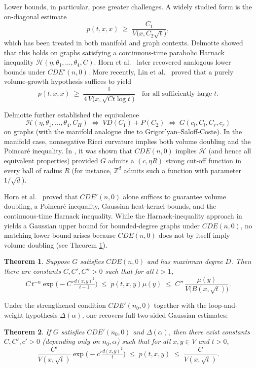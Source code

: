 \documentclass[reqno,12pt]{amsart}
\numberwithin{equation}{section}
\newtheorem{theorem}{Theorem}[section]
\begin{document}
	Lower bounds, in particular, pose greater challenges.  A widely studied form is the on‐diagonal estimate
	\[
	p(t,x,x)\;\ge\;\frac{C_1}{V\bigl(x,C_2\sqrt t\bigr)},
	\]
	which has been treated in both manifold and graph contexts.  Delmotte \cite{delmotte1999parabolic} showed that this holds on graphs satisfying a continuous‐time parabolic Harnack inequality $\mathcal H(\eta,\theta_1,\dots,\theta_4,C)$.  Horn et al.\ \cite{horn2019volume} later recovered analogous lower bounds under $CDE'(n,0)$.  More recently, Lin et al.\ \cite{lin2017diagonal} proved that a purely volume‐growth hypothesis suffices to yield
	\[
	p(t,x,x)\;\ge\;\frac1{4\,V\!\bigl(x,\sqrt{Ct\log t}\bigr)}
	\quad\text{for all sufficiently large }t.
	\]
	
	Delmotte further established the equivalence
	\[
	\mathcal H(\eta,\theta_1,\dots,\theta_4,C_H)
	\;\Longleftrightarrow\;
	VD(C_1)+P(C_2)
	\;\Longleftrightarrow\;
	G(c_l,C_l,C_r,c_r)
	\]
	on graphs (with the manifold analogue due to Grigor’yan–Saloff‐Coste).  In the manifold case, nonnegative Ricci curvature implies both volume doubling and the Poincaré inequality.  In \cite{bauer2015li}, it was shown that $CDE(n,0)$ implies $\mathcal H$ (and hence all equivalent properties) provided $G$ admits a $(c,\eta R)$ strong cut‐off function in every ball of radius $R$ (for instance, $\mathbb Z^d$ admits such a function with parameter $1/\sqrt d$).
	
	Horn et al.\ \cite{horn2019volume} proved that $CDE'(n,0)$ alone suffices to guarantee volume doubling, a Poincaré inequality, Gaussian heat‐kernel bounds, and the continuous‐time Harnack inequality.  While the Harnack‐inequality approach in \cite{bauer2015li} yields a Gaussian upper bound for bounded‐degree graphs under $CDE(n,0)$, no matching lower bound arises because $CDE(n,0)$ does not by itself imply volume doubling (see Theorem \ref{gau1}).
	
	\begin{theorem}\label{gau1}
		Suppose $G$ satisfies $CDE(n,0)$ and has maximum degree $D$.  Then there are constants $C,C',C''>0$ such that for all $t>1$,
		\[
		C\,t^{-n}\exp\!\bigl(-C'\tfrac{d(x,y)^2}{t-1}\bigr)
		\;\le\;p(t,x,y)\mu(y)\;\le\;
		C''\,\frac{\mu(y)}{V\bigl(B(x,\sqrt t)\bigr)}.
		\]
	\end{theorem}
	
	Under the strengthened condition $CDE'(n_0,0)$ together with the loop‐and‐weight hypothesis $\Delta(\alpha)$, one recovers full two‐sided Gaussian estimates:
	
	\begin{theorem}\label{gaus1}
		If $G$ satisfies $CDE'(n_0,0)$ and $\Delta(\alpha)$, then there exist constants $C,C',c'>0$ (depending only on $n_0,\alpha$) such that for all $x,y\in V$ and $t>0$,
		\[
		\frac{C'}{V(x,\sqrt t)}
		\exp\!\bigl(-c'\tfrac{d(x,y)^2}{t}\bigr)
		\;\le\;
		p(t,x,y)
		\;\le\;
		\frac{C}{V(x,\sqrt t)}.
		\]
	\end{theorem}
	
\end{document}
